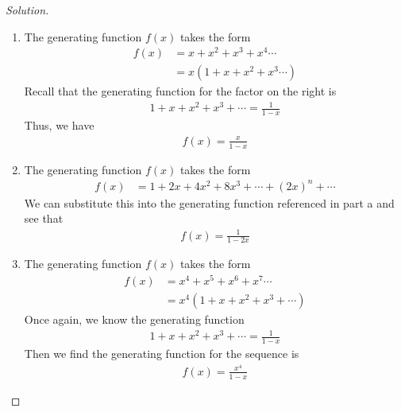 \documentclass[12pt]{article}
\theoremstyle{definition}
\newenvironment{solution}{
  \begin{proof}[Solution]
    \vspace{-8px}
    \setlength{\parskip}{4px}
    \setlength{\parindent}{0px}
}{
\end{proof}
}
\begin{document}
  \begin{solution}
    \hfill
    \begin{enumerate}[label={\alph*.}]
      \item The generating function \(f(x)\) takes the form
      \begin{align*}
        f(x) &= x + x^{2} + x^{3} + x^{4} \cdots \\
             &= x (1 + x + x^{2} + x^{3} \cdots)
      \end{align*}
      Recall that the generating function for the factor on the right is
      \begin{align*}
        1 + x + x^2 + x^3 + \cdots = \frac{1}{1 - x}
      \end{align*}
      Thus, we have
      \begin{align*}
        f(x) = \frac{x}{1 - x}
      \end{align*}

      \addtocounter{enumi}{1}

      \item The generating function \(f(x)\) takes the form
      \begin{align*}
        f(x) &= 1 + 2x + 4x^{2} + 8x^{3} + \cdots + (2x)^{n} + \cdots
      \end{align*}
      We can substitute this into the generating function referenced in part a and see that
      \begin{align*}
        f(x) = \frac{1}{1 - 2x}
      \end{align*}

      \item The generating function \(f(x)\) takes the form
      \begin{align*}
        f(x) &= x^{4} + x^{5} + x^{6} + x^{7} \cdots \\
             &= x^{4} (1 + x + x^{2} + x^{3} + \cdots)
      \end{align*}
      Once again, we know the generating function
      \begin{align*}
        1 + x + x^{2} + x^{3} + \cdots = \frac{1}{1 - x}
      \end{align*}
      Then we find the generating function for the sequence is
      \begin{align*}
        f(x) = \frac{x^{4}}{1 - x}
      \end{align*}

      \addtocounter{enumi}{1}


\end{enumerate}
\end{solution}
\end{document}
